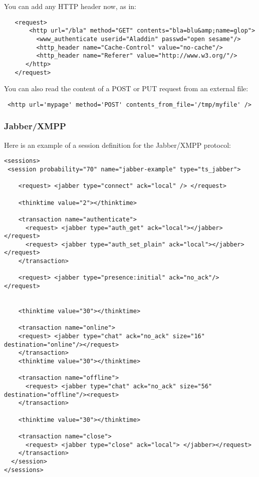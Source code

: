 \documentclass{TSUNG-en}
\begin{document}
 You can add any HTTP header now, as in:
\begin{Verbatim}
   <request>
       <http url="/bla" method="GET" contents="bla=blu&amp;name=glop">
         <www_authenticate userid="Aladdin" passwd="open sesame"/>
         <http_header name="Cache-Control" value="no-cache"/>
         <http_header name="Referer" value="http://www.w3.org/"/>
      </http>
   </request>
\end{Verbatim}

 You can also read the content of a POST or PUT
request from an external file:

\begin{Verbatim}
 <http url='mypage' method='POST' contents_from_file='/tmp/myfile' />
\end{Verbatim}


\subsubsection{Jabber/XMPP}

\label{sec:sessions:jabber}
\par Here is an example of a session definition for the Jabber/XMPP protocol:
\begin{Verbatim}
<sessions>
 <session probability="70" name="jabber-example" type="ts_jabber">

    <request> <jabber type="connect" ack="local" /> </request>

    <thinktime value="2"></thinktime>

    <transaction name="authenticate">
      <request> <jabber type="auth_get" ack="local"></jabber> </request>
      <request> <jabber type="auth_set_plain" ack="local"></jabber> </request>
    </transaction>

    <request> <jabber type="presence:initial" ack="no_ack"/> </request>


    <thinktime value="30"></thinktime>

    <transaction name="online">
    <request> <jabber type="chat" ack="no_ack" size="16" destination="online"/></request>
    </transaction>
    <thinktime value="30"></thinktime>

    <transaction name="offline">
      <request> <jabber type="chat" ack="no_ack" size="56" destination="offline"/><request>
    </transaction>

    <thinktime value="30"></thinktime>

    <transaction name="close">
      <request> <jabber type="close" ack="local"> </jabber></request>
    </transaction>
  </session>
</sessions>
\end{Verbatim}
\end{document}
